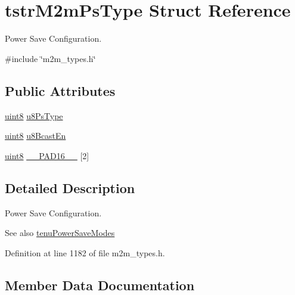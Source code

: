 \hypertarget{structtstrM2mPsType}{}\section{tstr\+M2m\+Ps\+Type Struct Reference}
\label{structtstrM2mPsType}


Power Save Configuration.  




{\ttfamily \#include \char`\"{}m2m\+\_\+types.\+h\char`\"{}}

\subsection*{Public Attributes}
\begin{DoxyCompactItemize}
\item 
\hyperlink{group__DataT_ga4df709a77647e870bbf1d955b8edc9a6}{uint8} \hyperlink{structtstrM2mPsType_a3e06c6db1c8e30972e3666adcc2324e7}{u8\+Ps\+Type}
\item 
\hyperlink{group__DataT_ga4df709a77647e870bbf1d955b8edc9a6}{uint8} \hyperlink{structtstrM2mPsType_a86e703a96c3ff79176b783f3afa96f9e}{u8\+Bcast\+En}
\item 
\hyperlink{group__DataT_ga4df709a77647e870bbf1d955b8edc9a6}{uint8} \hyperlink{structtstrM2mPsType_a944bb91dffaca577970291e09542e9a8}{\+\_\+\+\_\+\+P\+A\+D16\+\_\+\+\_\+} \mbox{[}2\mbox{]}
\end{DoxyCompactItemize}


\subsection{Detailed Description}
Power Save Configuration. 

\begin{DoxySeeAlso}{See also}
\hyperlink{group__WlanEnums_gae6bd0ac78bfca4cda17d9dbedf79ad7e}{tenu\+Power\+Save\+Modes} 
\end{DoxySeeAlso}


Definition at line 1182 of file m2m\+\_\+types.\+h.



\subsection{Member Data Documentation}
\mbox{\label{structtstrM2mPsType_a944bb91dffaca577970291e09542e9a8}} 

